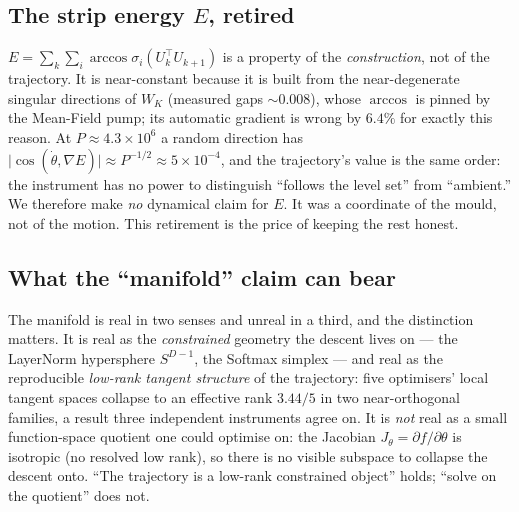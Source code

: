 \subsection{The strip energy $E$, retired}
$E=\sum_k\sum_i \arccos\sigma_i(U_k^\top U_{k+1})$ is a property of the
\emph{construction}, not of the trajectory. It is near-constant because it is
built from the near-degenerate singular directions of $W_K$ (measured gaps
$\sim\!0.008$), whose $\arccos$ is pinned by the Mean-Field pump; its automatic
gradient is wrong by $6.4\%$ for exactly this reason. At $P\approx 4.3\times10^6$
a random direction has $\lvert\cos(\dot\theta,\nabla E)\rvert\approx P^{-1/2}
\approx 5\times10^{-4}$, and the trajectory's value is the same order: the
instrument has no power to distinguish ``follows the level set'' from ``ambient.''
We therefore make \emph{no} dynamical claim for $E$. It was a coordinate of the
mould, not of the motion. This retirement is the price of keeping the rest
honest.

\subsection{What the ``manifold'' claim can bear}
The manifold is real in two senses and unreal in a third, and the distinction
matters. It is real as the \emph{constrained} geometry the descent lives on ---
the LayerNorm hypersphere $S^{D-1}$, the Softmax simplex --- and real as the
reproducible \emph{low-rank tangent structure} of the trajectory: five
optimisers' local tangent spaces collapse to an effective rank $3.44/5$ in two
near-orthogonal families, a result three independent instruments agree on. It is
\emph{not} real as a small function-space quotient one could optimise on: the
Jacobian $J_\theta=\partial f/\partial\theta$ is isotropic (no resolved low rank),
so there is no visible subspace to collapse the descent onto. ``The trajectory is
a low-rank constrained object'' holds; ``solve on the quotient'' does not.

